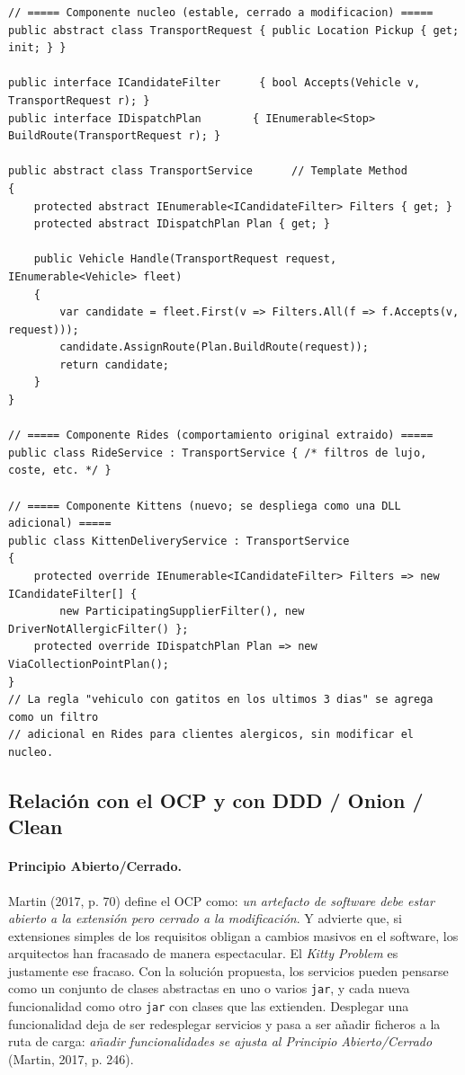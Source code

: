 \documentclass[11pt,a4paper]{article}
\begin{document}
\begin{lstlisting}[caption={Esbozo del núcleo abstracto y de los componentes que lo extienden.}]
// ===== Componente nucleo (estable, cerrado a modificacion) =====
public abstract class TransportRequest { public Location Pickup { get; init; } }

public interface ICandidateFilter      { bool Accepts(Vehicle v, TransportRequest r); }
public interface IDispatchPlan        { IEnumerable<Stop> BuildRoute(TransportRequest r); }

public abstract class TransportService      // Template Method
{
    protected abstract IEnumerable<ICandidateFilter> Filters { get; }
    protected abstract IDispatchPlan Plan { get; }

    public Vehicle Handle(TransportRequest request, IEnumerable<Vehicle> fleet)
    {
        var candidate = fleet.First(v => Filters.All(f => f.Accepts(v, request)));
        candidate.AssignRoute(Plan.BuildRoute(request));
        return candidate;
    }
}

// ===== Componente Rides (comportamiento original extraido) =====
public class RideService : TransportService { /* filtros de lujo, coste, etc. */ }

// ===== Componente Kittens (nuevo; se despliega como una DLL adicional) =====
public class KittenDeliveryService : TransportService
{
    protected override IEnumerable<ICandidateFilter> Filters => new ICandidateFilter[] {
        new ParticipatingSupplierFilter(), new DriverNotAllergicFilter() };
    protected override IDispatchPlan Plan => new ViaCollectionPointPlan();
}
// La regla "vehiculo con gatitos en los ultimos 3 dias" se agrega como un filtro
// adicional en Rides para clientes alergicos, sin modificar el nucleo.
\end{lstlisting}

\subsection{Relación con el OCP y con DDD / Onion / Clean}

\paragraph{Principio Abierto/Cerrado.} Martin (2017, p. 70) define el OCP como: \emph{un artefacto de software debe estar abierto a la extensión pero cerrado a la modificación}. Y advierte que, si extensiones simples de los requisitos obligan a cambios masivos en el software, los arquitectos han fracasado de manera espectacular. El \emph{Kitty Problem} es justamente ese fracaso. Con la solución propuesta, los servicios pueden pensarse como un conjunto de clases abstractas en uno o varios \texttt{jar}, y cada nueva funcionalidad como otro \texttt{jar} con clases que las extienden. Desplegar una funcionalidad deja de ser redesplegar servicios y pasa a ser añadir ficheros a la ruta de carga: \emph{añadir funcionalidades se ajusta al Principio Abierto/Cerrado} (Martin, 2017, p. 246).
\end{document}
